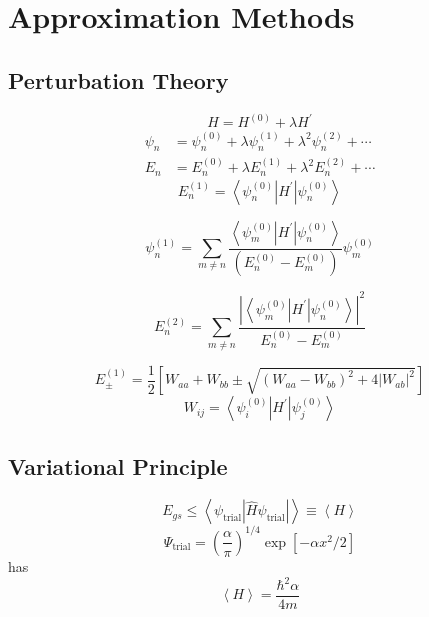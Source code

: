\section{Approximation Methods}
\subsection{Perturbation Theory}

\begin{equation*}
    H=H^{(0)}+\lambda H^{\prime}
\end{equation*}
\begin{align*}
    \psi_{n} & =\psi_{n}^{(0)}+\lambda\psi_{n}^{(1)}+\lambda^{2}\psi_{n}^{(2)}+\cdots \\
    E_{n}    & =E_{n}^{(0)}+\lambda E_{n}^{(1)}+\lambda^{2}E_{n}^{(2)}+\cdots
\end{align*}
\begin{equation*}
    E_{n}^{(1)}=\left\langle\psi_{n}^{(0)}\left| H^{\prime} \right|\psi_{n}^{(0)}\right\rangle
\end{equation*}

\begin{equation*}
    \psi_{n}^{(1)}=\sum_{m\neq n}\frac{\left\langle\psi_{m}^{(0)}\left|H^{\prime}\right|\psi_{n}^{(0)}\right\rangle}{\left(E_{n}^{(0)}-E_{m}^{(0)}\right)}\psi_{m}^{(0)}
\end{equation*}

\begin{equation*}
    E_{n}^{(2)}=\sum_{m\neq n}\frac{\left|\left\langle\psi_{m}^{(0)}\left|H^{\prime}\right|\psi_{n}^{(0)}\right\rangle\right|^{2}}{E_{n}^{(0)}-E_{m}^{(0)}}
\end{equation*}

\begin{equation*}
    E_{\pm}^{(1)}=\frac{1}{2}\left[W_{aa}+W_{bb}\pm\sqrt{{(W_{aa}-W_{bb})}^{2}+4 |W_{ab}|^{2}}\right]
\end{equation*}
\begin{equation*}
    W_{ij}=\left\langle\psi_{i}^{(0)} \left| H^{\prime} \right|\psi_{j}^{(0)}\right\rangle 
\end{equation*}
\subsection{Variational Principle}
\begin{equation*}
    E_{gs}\leq\left\langle\psi_{\mathrm{trial}}\left|\hat{H} \psi_{\mathrm{trial}}\right|\right\rangle \equiv \left<H\right>
\end{equation*}
\begin{equation*}
    \Psi_{\mathrm{trial}}={\left(\frac{\alpha}{\pi}\right)}^{1/4}\exp\left[-\alpha x^{2}/2\right]
\end{equation*}
has 
\begin{equation*}
    \left<H\right>=\frac{\hbar^2\alpha}{4m}
\end{equation*}
